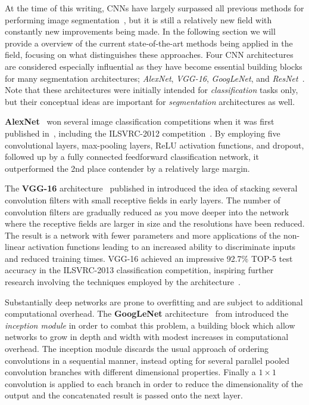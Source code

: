 At the time of this writing, CNNs have largely surpassed all previous methods for performing image segmentation~\cite{segmentation-overview}, but it is still a relatively new field with constantly new improvements being made.
In the following section we will provide a overview of the current state-of-the-art methods being applied in the field, focusing on what distinguishes these approaches.
Four CNN architectures are considered especially influential as they have become essential building blocks for many segmentation architectures; \textit{AlexNet}, \textit{VGG-16}, \textit{GoogLeNet}, and \textit{ResNet}~\cite{segmentation-overview}.
Note that these architectures were initially intended for \textit{classification} tasks only, but their conceptual ideas are important for \textit{segmentation} architectures as well.

\textbf{AlexNet}~\cite{segmentation-alexnet} won several image classification competitions when it was first published in~\citeyear{segmentation-alexnet}, including the ILSVRC-2012 competition~\cite{segmentation-overview}.
By employing five convolutional layers, max-pooling layers, ReLU activation functions, and dropout, followed up by a fully connected feedforward classification network, it outperformed the 2nd place contender by a relatively large margin.

The \textbf{VGG-16} architecture~\cite{vgg-16} published in \citeyear{vgg-16} introduced the idea of stacking several convolution filters with small receptive fields in early layers.
The number of convolution filters are gradually reduced as you move deeper into the network where the receptive fields are larger in size and the resolutions have been reduced.
The result is a network with fewer parameters and more applications of the non-linear activation functions leading to an increased ability to discriminate inputs and reduced training times.
VGG-16 achieved an impressive 92.7\% TOP-5 test accuracy in the ILSVRC-2013 classification competition, inspiring further research involving the techniques employed by the architecture~\cite{segmentation-overview}.

Substantially deep networks are prone to overfitting and are subject to additional computational overhead.
The \textbf{GoogLeNet} architecture~\cite{googlenet} from \citeyear{googlenet} introduced the \textit{inception module} in order to combat this problem, a building block which allow networks to grow in depth and width with modest increases in computational overhead.
The inception module discards the usual approach of ordering convolutions in a sequential manner, instead opting for several parallel pooled convolution branches with different dimensional properties.
Finally a $1 \times 1$ convolution is applied to each branch in order to reduce the dimensionality of the output and the concatenated result is passed onto the next layer.

